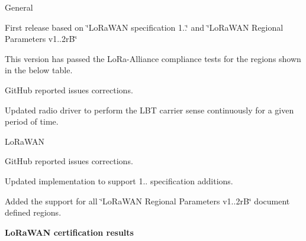 \begin{DoxyItemize}
\item General
\begin{DoxyEnumerate}
\item First release based on \char`\"{}\+Lo\+Ra\+W\+A\+N specification 1..\char`\"{} and \char`\"{}\+Lo\+Ra\+W\+A\+N Regional Parameters v1..\+2r\+B\char`\"{}
\item This version has passed the Lo\+Ra-\/\+Alliance compliance tests for the regions shown in the below table.
\item Git\+Hub reported issues corrections.
\item Updated radio driver to perform the L\+BT carrier sense continuously for a given period of time.
\end{DoxyEnumerate}
\item Lo\+Ra\+W\+AN
\begin{DoxyEnumerate}
\item Git\+Hub reported issues corrections.
\item Updated implementation to support 1.. specification additions.
\item Added the support for all \char`\"{}\+Lo\+Ra\+W\+A\+N Regional Parameters v1..\+2r\+B\char`\"{} document defined regions.
\end{DoxyEnumerate}
\end{DoxyItemize}

{\bfseries Lo\+Ra\+W\+AN certification results}

